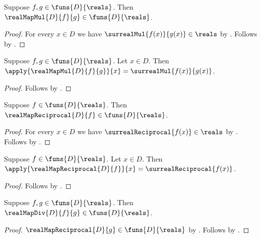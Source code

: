 \begin{proposition}\label{real_map_mul_type}
    Suppose $f,g\in\funs{D}{\reals}$.
    Then $\realMapMul{D}{f}{g}\in\funs{D}{\reals}$.
\end{proposition}
\begin{proof}
    For every $x\in D$ we have $\surrealMul{f(x)}{g(x)}\in\reals$
        by .
    Follows by .
\end{proof}

\begin{proposition}\label{real_map_mul_apply}
    Suppose $f,g\in\funs{D}{\reals}$.
    Let $x\in D$.
    Then $\apply{\realMapMul{D}{f}{g}}{x}
        =\surrealMul{f(x)}{g(x)}$.
\end{proposition}
\begin{proof}
    Follows by .
\end{proof}

\begin{proposition}\label{real_map_reciprocal_type}
    Suppose $f\in\funs{D}{\reals}$.
    Then $\realMapReciprocal{D}{f}\in\funs{D}{\reals}$.
\end{proposition}
\begin{proof}
    For every $x\in D$ we have $\surrealReciprocal{f(x)}\in\reals$
        by .
    Follows by
        .
\end{proof}

\begin{proposition}\label{real_map_reciprocal_apply}
    Suppose $f\in\funs{D}{\reals}$.
    Let $x\in D$.
    Then $\apply{\realMapReciprocal{D}{f}}{x}
        =\surrealReciprocal{f(x)}$.
\end{proposition}
\begin{proof}
    Follows by
        .
\end{proof}

\begin{proposition}\label{real_map_div_type}
    Suppose $f,g\in\funs{D}{\reals}$.
    Then $\realMapDiv{D}{f}{g}\in\funs{D}{\reals}$.
\end{proposition}
\begin{proof}
    $\realMapReciprocal{D}{g}\in\funs{D}{\reals}$
        by .
    Follows by .
\end{proof}

